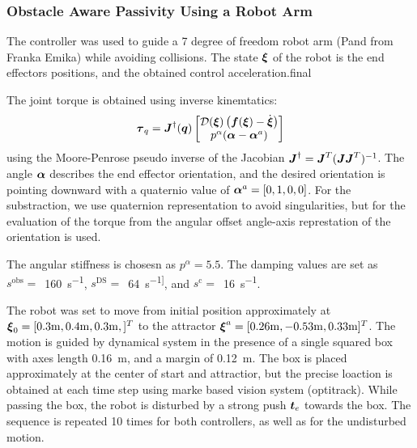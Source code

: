\subsubsection{Obstacle Aware Passivity Using a Robot Arm}
The controller was used to guide a 7 degree of freedom robot arm (Pand from Franka Emika) while avoiding collisions. The state $\boldsymbol{\xi}$ of the robot is the end effectors positions, and the obtained control acceleration.final 

The joint torque is obtained using inverse kinemtatics:
\begin{equation}
	\boldsymbol{\tau}_q = \boldsymbol{J}^{\dag}(\boldsymbol{q}) 
	\begin{bmatrix} \mathcal{D}(\boldsymbol{\xi}) \left( \boldsymbol{f}(\boldsymbol{\xi}) - \dot{\boldsymbol{\xi}} \right) \\  p^\alpha (\boldsymbol{\alpha} - \boldsymbol{\alpha}^a) \end{bmatrix}
\end{equation}
using the Moore-Penrose pseudo inverse of the Jacobian $\boldsymbol{J}^{\dag} = \boldsymbol{J}^T (\boldsymbol{J} \boldsymbol{J}^T)^{-1}$. The angle $\boldsymbol{\alpha}$ describes the end effector orientation, and the desired orientation is pointing downward with a quaternio value of $\boldsymbol{\alpha}^a = [0, 1, 0, 0]$. For the substraction, we use quaternion representation to avoid singularities, but for the evaluation of the torque from the angular offset angle-axis represtation of the orientation is used.

The angular stiffness is chosesn as $p^\alpha = 5.5$.
The damping values are set as
$s^{\mathrm{obs}}=\, $ \qty{160}{s^{-1}},
$s^{\mathrm{DS}}= \,$ \qty{64}{s^{-1]}}, and
$s^{\mathrm{c}}= \,$ \qty{16}{s^{-1}}.


The robot was set to move from initial position approximately at $\boldsymbol{\xi}_0 = [0.3\mathrm{m}, 0.4\mathrm{m}, 0.3\mathrm{m},]^T$ to the attractor $\boldsymbol{\xi}^a = [0.26 \mathrm{m}, -0.53\mathrm{m}, 0.33\mathrm{m}]^T$.
The motion is guided by dynamical system in the presence of a single squared box with axes length \qty{0.16}{m}, and a margin of \qty{0.12}{m}. The box is placed approximately at the center of start and attractior, but the precise loaction  is obtained at each time step using marke based vision system (optitrack). 
While passing the box, the robot is disturbed by a strong push $\boldsymbol{t}_e$ towards the box. The sequence is repeated 10 times for both controllers, as well as for the undisturbed motion.

